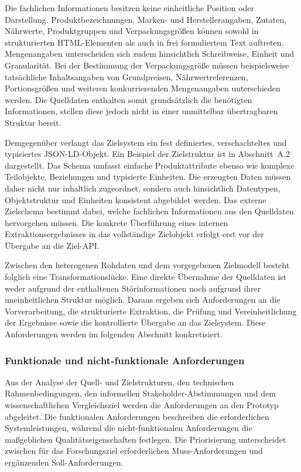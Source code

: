 Die fachlichen Informationen besitzen keine einheitliche Position oder Darstellung. Produktbezeichnungen, Marken- und Herstellerangaben, Zutaten, Nährwerte, Produktgruppen 
und Verpackungsgrößen können sowohl in strukturierten HTML-Elementen als auch in frei formuliertem Text auftreten. Mengenangaben unterscheiden sich zudem hinsichtlich 
Schreibweise, Einheit und Granularität. Bei der Bestimmung der Verpackungsgröße müssen beispielsweise tatsächliche Inhaltsangaben von Grundpreisen, Nährwertreferenzen, 
Portionsgrößen und weiteren konkurrierenden Mengenangaben unterschieden werden. Die Quelldaten enthalten somit grundsätzlich die benötigten Informationen, stellen diese 
jedoch nicht in einer unmittelbar übertragbaren Struktur bereit.

Demgegenüber verlangt das Zielsystem ein fest definiertes, verschachteltes und typisiertes JSON-LD-Objekt. Ein Beispiel der Zielstruktur ist in Abschnitt~A.2 dargestellt. 
Das Schema umfasst einfache Produktattribute ebenso wie komplexe Teilobjekte, Beziehungen und typisierte Einheiten. Die erzeugten Daten müssen daher nicht nur inhaltlich 
zugeordnet, sondern auch hinsichtlich Datentypen, Objektstruktur und Einheiten konsistent abgebildet werden. Das externe Zielschema bestimmt dabei, welche fachlichen 
Informationen aus den Quelldaten hervorgehen müssen. Die konkrete Überführung eines internen Extraktionsergebnisses in das vollständige Zielobjekt erfolgt erst vor der 
Übergabe an die Ziel-API.

Zwischen den heterogenen Rohdaten und dem vorgegebenen Zielmodell besteht folglich eine Transformationslücke. Eine direkte Übernahme der Quelldaten ist weder aufgrund der 
enthaltenen Störinformationen noch aufgrund ihrer uneinheitlichen Struktur möglich. Daraus ergeben sich Anforderungen an die Vorverarbeitung, die strukturierte Extraktion, 
die Prüfung und Vereinheitlichung der Ergebnisse sowie die kontrollierte Übergabe an das Zielsystem. Diese Anforderungen werden im folgenden Abschnitt konkretisiert.

\subsubsection{Funktionale und nicht-funktionale Anforderungen}

Aus der Analyse der Quell- und Zielstrukturen, den technischen Rahmenbedingungen, den informellen Stakeholder-Abstimmungen und dem wissenschaftlichen Vergleichsziel werden 
die Anforderungen an den Prototyp abgeleitet. Die funktionalen Anforderungen beschreiben die erforderlichen Systemleistungen, während die nicht-funktionalen Anforderungen 
die maßgeblichen Qualitätseigenschaften festlegen. Die Priorisierung unterscheidet zwischen für das Forschungsziel erforderlichen Muss-Anforderungen und ergänzenden Soll-Anforderungen.

